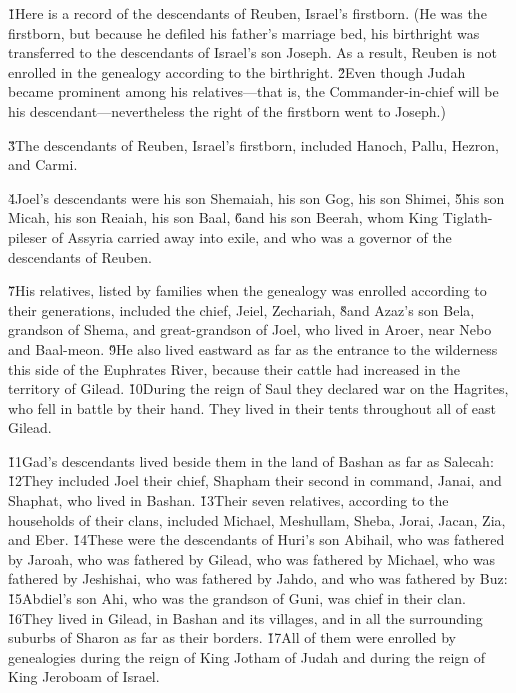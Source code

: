 \v{1}Here is a record of the descendants of Reuben, Israel's firstborn. (He was the firstborn, but because he defiled his father's marriage bed, his birthright was transferred to the descendants of Israel's son Joseph. As a result, Reuben is not enrolled in the genealogy according to the birthright. \v{2}Even though Judah became prominent among his relatives---that is, the Commander-in-chief will be his descendant---nevertheless the right of the firstborn went to Joseph.)

\v{3}The descendants of Reuben, Israel's firstborn, included Hanoch, Pallu, Hezron, and Carmi.

\v{4}Joel's descendants were his son Shemaiah, his son Gog, his son Shimei, \v{5}his son Micah, his son Reaiah, his son Baal, \v{6}and his son Beerah, whom King Tiglath-pileser of Assyria carried away into exile, and who was a governor of the descendants of Reuben.

\v{7}His relatives, listed by families when the genealogy was enrolled according to their generations, included the chief, Jeiel, Zechariah, \v{8}and Azaz's son Bela, grandson of Shema, and great-grandson of Joel, who lived in Aroer, near Nebo and Baal-meon. \v{9}He also lived eastward as far as the entrance to the wilderness this side of the Euphrates River, because their cattle had increased in the territory of Gilead. \v{10}During the reign of Saul they declared war on the Hagrites, who fell in battle by their hand. They lived in their tents throughout all of east Gilead.

\v{11}Gad's descendants lived beside them in the land of Bashan as far as Salecah: \v{12}They included Joel their chief, Shapham their second in command, Janai, and Shaphat, who lived in Bashan. \v{13}Their seven relatives, according to the households of their clans, included Michael, Meshullam, Sheba, Jorai, Jacan, Zia, and Eber. \v{14}These were the descendants of Huri's son Abihail, who was fathered by Jaroah, who was fathered by Gilead, who was fathered by Michael, who was fathered by Jeshishai, who was fathered by Jahdo, and who was fathered by Buz: \v{15}Abdiel's son Ahi, who was the grandson of Guni, was chief in their clan. \v{16}They lived in Gilead, in Bashan and its villages, and in all the surrounding suburbs of Sharon as far as their borders. \v{17}All of them were enrolled by genealogies during the reign of King Jotham of Judah and during the reign of King Jeroboam of Israel.

